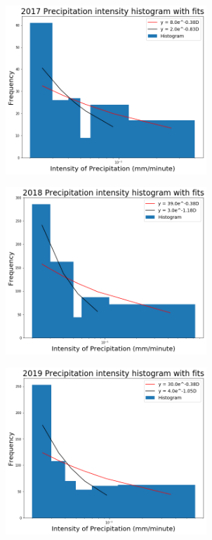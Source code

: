 \documentclass[11pt]{report}
\begin{document}
\clearpage
\begin{figure}[t]
	\centering
	\includegraphics[width=0.675\textwidth]{Figures/inten2017_fit.png}
	\caption[Fitting Intensity histogram for 2017 with different bins]
	{\label{i2017_fit} }
\end{figure}

\begin{figure}[b]
	\centering
	\includegraphics[width=0.675\textwidth]{Figures/inten2018_fit.png}
	\caption[Fitting Intensity histogram for 2018 with different bins]
	{\label{i2018_fit} }
\end{figure}

\clearpage
\begin{figure}[t]
	\centering
	\includegraphics[width=0.675\textwidth]{Figures/inten2019_fit.png}
	\caption[Fitting Intensity histogram for 2019 with different bins]
	{\label{i2019_fit}  
	}
\end{figure}
\end{document}
